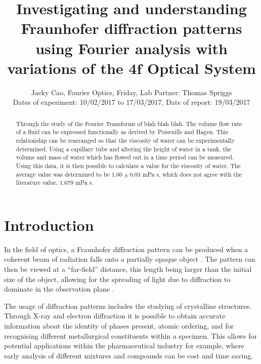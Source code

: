 \documentclass[twocolumn]{revtex4}
\begin{document}
\textheight=26.385cm

\title{Investigating and understanding Fraunhofer diffraction patterns using Fourier analysis with variations of the $\boldsymbol{4f}$ Optical System}
 
\author{Jacky Cao, Fourier Optics, Friday, Lab Partner: Thomas Spriggs \\ Dates of experiment: 10/02/2017 to 17/03/2017, Date of report: 19/03/2017}

\begin{abstract}              
Through the study of the Fourier Transforms of blah blah blah. The volume flow rate of a fluid can be expressed functionally as derived by Poiseuille and Hagen. This relationship can be rearranged so that the viscosity of water can be experimentally determined. Using a capillary tube and altering the height of water in a tank, the volume and mass of water which has flowed out in a time period can be measured. Using this data, it is then possible to calculate a value for the viscosity of water. The average value was determined to be $1.00 \pm 0.03$ mPa s, which does not agree with the literature value, $1.679$ mPa s. 
\end{abstract}

\maketitle

\section{Introduction} 
\vspace{-2ex} 

In the field of optics, a Fraunhofer diffraction pattern can be produced when a coherent beam of radiation falls onto a partially opaque object \cite{mathmethods}. The pattern can then be viewed at a ``far-field'' distance, this length being larger than the initial size of the object, allowing for the spreading of light due to diffraction to dominate in the observation plane \cite{of2f}. 

The usage of diffraction patterns includes the studying of crystalline structures. Through X-ray and electron diffraction it is possible to obtain accurate information about the identity of phases present, atomic ordering, and for recognising different metallurgical constituents within a specimen. This allows for potential applications within the pharmaceutical industry for example, where early analysis of different mixtures and compounds can be cost and time saving. \cite{elecdiffraction, xraypharma}
\end{document}
